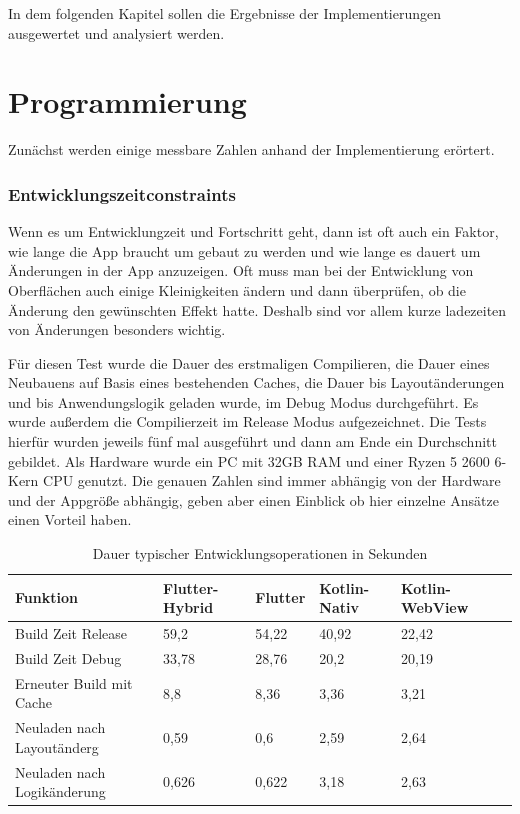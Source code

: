 In dem folgenden Kapitel sollen die Ergebnisse der Implementierungen ausgewertet und analysiert werden. 

\section{Programmierung}
Zunächst werden einige messbare Zahlen anhand der Implementierung erörtert. 

\subsubsection{Entwicklungszeitconstraints}
Wenn es um Entwicklungzeit und Fortschritt geht, dann ist oft auch ein Faktor, wie lange die App braucht um gebaut zu werden und wie lange es dauert um Änderungen in der App anzuzeigen. Oft muss man bei der Entwicklung von Oberflächen auch einige Kleinigkeiten ändern und dann überprüfen, ob die Änderung den gewünschten Effekt hatte. Deshalb sind vor allem kurze ladezeiten von Änderungen besonders wichtig.

Für diesen Test wurde die Dauer des erstmaligen Compilieren, die Dauer eines Neubauens auf Basis eines bestehenden Caches, die Dauer bis Layoutänderungen und bis Anwendungslogik geladen wurde, im Debug Modus durchgeführt. Es wurde außerdem die Compilierzeit im Release Modus aufgezeichnet.
Die Tests hierfür wurden jeweils fünf mal ausgeführt und dann am Ende ein Durchschnitt gebildet. Als Hardware wurde ein PC mit 32GB RAM und einer Ryzen 5 2600 6-Kern CPU genutzt. 
Die genauen Zahlen sind immer abhängig von der Hardware und der Appgröße abhängig, geben aber einen Einblick ob hier einzelne Ansätze einen Vorteil haben. 

\begin{table}
\centering
\caption{Dauer typischer Entwicklungsoperationen in Sekunden}
\begin{tabular}{ |p{4cm}||p{3cm}|p{2cm}|p{2cm}|p{3cm}|p{3cm}| }
 \hline
 Funktion & Flutter-Hybrid & Flutter & Kotlin-Nativ & Kotlin-WebView \\
 \hline
 Build Zeit Release       &   59,2&   54,22& 40,92& 22,42\\
  \hline
 Build Zeit Debug  & 33,78& 28,76& 20,2& 20,19\\
  \hline
 Erneuter Build mit Cache & 8,8& 8,36& 3,36& 3,21\\
  \hline
 Neuladen nach Layoutänderg & 0,59& 0,6& 2,59& 2,64\\
  \hline
 Neuladen nach Logikänderung & 0,626& 0,622& 3,18& 2,63\\
  \hline
\end{tabular}
\label{tab:evaluations_build_time}
\end{table}

